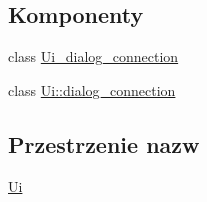 \subsection*{Komponenty}
\begin{DoxyCompactItemize}
\item 
class \hyperlink{class_ui__dialog__connection}{Ui\+\_\+dialog\+\_\+connection}
\item 
class \hyperlink{class_ui_1_1dialog__connection}{Ui\+::dialog\+\_\+connection}
\end{DoxyCompactItemize}
\subsection*{Przestrzenie nazw}
\begin{DoxyCompactItemize}
\item 
 \hyperlink{namespace_ui}{Ui}
\end{DoxyCompactItemize}
